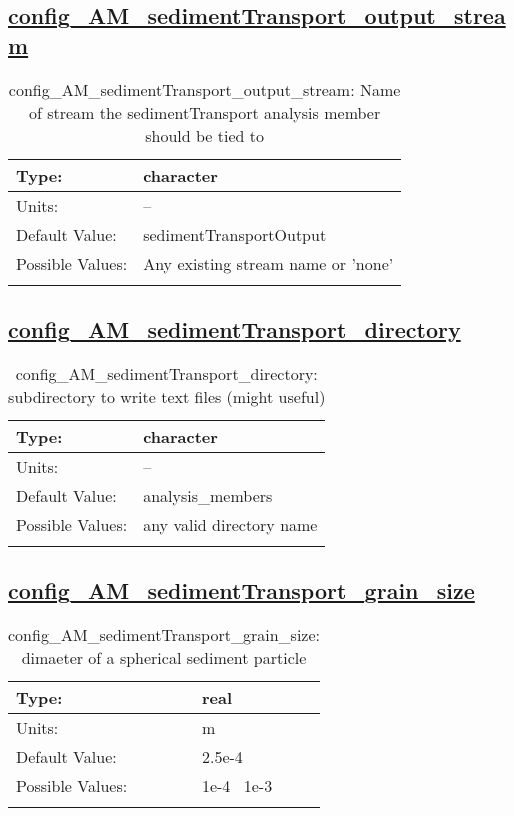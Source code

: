 \subsection[config\_AM\_sedimentTransport\_output\_stream]{\hyperref[sec:nm_tab_AM_sedimentTransport]{config\_AM\_sedimentTransport\_output\_stream}}
\label{subsec:nm_sec_config_AM_sedimentTransport_output_stream}
\begin{center}
\begin{longtable}{| p{2.0in} || p{4.0in} |}
    \hline
    Type: & character \\
    \hline
    Units: & -- \\
    \hline
    Default Value: & sedimentTransportOutput \\
    \hline
    Possible Values: & Any existing stream name or 'none' \\
    \hline
    \caption{config\_AM\_sedimentTransport\_output\_stream: Name of stream the sedimentTransport analysis member should be tied to}
\end{longtable}
\end{center}
\subsection[config\_AM\_sedimentTransport\_directory]{\hyperref[sec:nm_tab_AM_sedimentTransport]{config\_AM\_sedimentTransport\_directory}}
\label{subsec:nm_sec_config_AM_sedimentTransport_directory}
\begin{center}
\begin{longtable}{| p{2.0in} || p{4.0in} |}
    \hline
    Type: & character \\
    \hline
    Units: & -- \\
    \hline
    Default Value: & analysis\_members \\
    \hline
    Possible Values: & any valid directory name \\
    \hline
    \caption{config\_AM\_sedimentTransport\_directory: subdirectory to write text files (might useful)}
\end{longtable}
\end{center}
\subsection[config\_AM\_sedimentTransport\_grain\_size]{\hyperref[sec:nm_tab_AM_sedimentTransport]{config\_AM\_sedimentTransport\_grain\_size}}
\label{subsec:nm_sec_config_AM_sedimentTransport_grain_size}
\begin{center}
\begin{longtable}{| p{2.0in} || p{4.0in} |}
    \hline
    Type: & real \\
    \hline
    Units: & \si{m} \\
    \hline
    Default Value: & 2.5e-4 \\
    \hline
    Possible Values: & 1e-4 ~1e-3 \\
    \hline
    \caption{config\_AM\_sedimentTransport\_grain\_size: dimaeter of a spherical sediment particle}
\end{longtable}
\end{center}
